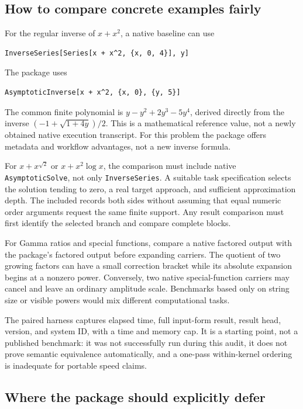 \subsection{How to compare concrete examples fairly}

For the regular inverse of $x+x^2$, a native baseline can use
\begin{lstlisting}
InverseSeries[Series[x + x^2, {x, 0, 4}], y]
\end{lstlisting}
The package uses
\begin{lstlisting}
AsymptoticInverse[x + x^2, {x, 0}, {y, 5}]
\end{lstlisting}
The common finite polynomial is $y-y^2+2y^3-5y^4$, derived directly from the inverse $(-1+\sqrt{1+4y})/2$. This is a mathematical reference value, not a newly obtained native execution transcript. For this problem the package offers metadata and workflow advantages, not a new inverse formula.\cite{wl-inverseseries,guide}

For $x+x^{\sqrt2}$ or $x+x^2\log x$, the comparison must include native \texttt{AsymptoticSolve}, not only \texttt{InverseSeries}. A suitable task specification selects the solution tending to zero, a real target approach, and sufficient approximation depth. The included  records both sides without assuming that equal numeric order arguments request the same finite support. Any result comparison must first identify the selected branch and compare complete blocks.\cite{wl-asymptoticsolve}

For Gamma ratios and special functions, compare a native factored output with the package's factored output before expanding carriers. The quotient of two growing factors can have a small correction bracket while its absolute expansion begins at a nonzero power. Conversely, two native special-function carriers may cancel and leave an ordinary amplitude scale. Benchmarks based only on string size or visible powers would mix different computational tasks.\cite{guide,native}

The paired harness captures elapsed time, full input-form result, result head, version, and system ID, with a time and memory cap. It is a starting point, not a published benchmark: it was not successfully run during this audit, it does not prove semantic equivalence automatically, and a one-pass within-kernel ordering is inadequate for portable speed claims.

\subsection{Where the package should explicitly defer}

